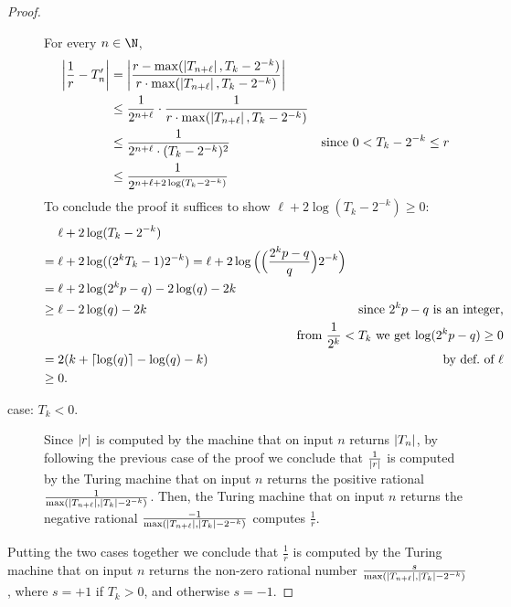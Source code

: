 \begin{proof}
\begin{description}
      For
      every $n \in \N$,
      \begin{align*}
        \left|\frac{1}{r} - T_n'\right|
        &= \left|\frac{r - \max(\left|T_{n+\ell}\right|,T_{k}-2^{-k})}{r \cdot \max(\left|T_{n+\ell}\right|,T_{k}-2^{-k})}\right|\\
        &\leq \frac{1}{2^{n+\ell}} 
        \cdot \frac{1}{r \cdot \max(\left|T_{n+\ell}\right|,T_{k}-2^{-k})}\\
        &\leq \frac{1}{2^{n+\ell} \cdot (T_k-2^{-k})^2}
        &\text{since } 0 < T_k - 2^{-k} \leq r\\
        &\leq \frac{1}{2^{n+\ell+2\log(T_k - 2^{-k})}}
      \end{align*}
      To conclude the proof it suffices to show $\ell + 2\log(T_k-2^{-k}) \geq 0$:
      \begin{align*}
        & \ell + 2\log(T_k-2^{-k})\\
        ={}& \ell + 2\log((2^{k}T_k-1)2^{-k})
        = \ell + 2\log\Big(\Big(\frac{2^{k}p-q}{q}\Big)2^{-k}\Big)\\
        ={}& \ell + 2\log(2^{k}p-q) -2\log(q) -2k\\
        \geq{}& \ell -2\log(q) -2k 
        & \text{since $2^kp-q$ is an integer,}\\
        && \hspace{-1.8cm}\text{from $\frac{1}{2^k} < T_k$ we get $\log(2^{k}p-q) \geq 0$}\\
        ={}& 2(k+\ceil{\log(q)}-\log(q)-k)
        &\text{by def.~of~$\ell$}\\
        \geq{}& 0.
      \end{align*}
    \item[case: $T_k < 0$.] 
      Since $\left|r\right|$ is computed by the machine that on input $n$ returns $\left|T_n\right|$, 
      by following the previous case of the proof
      we conclude that $\frac{1}{\left|r\right|}$ 
      is computed by the Turing machine that on input $n$
      returns the positive rational $\frac{1}{\max(\left|T_{n+\ell}\right|,\left|T_k\right| - 2^{-k})}$.
      Then, the Turing machine that on input $n$
      returns the negative rational $\frac{-1}{\max(\left|T_{n+\ell}\right|,\left|T_k\right| - 2^{-k})}$
      computes $\frac{1}{r}$.
  \end{description}
  Putting the two cases together we conclude that $\frac{1}{r}$ 
  is computed by the Turing machine 
  that on input $n$ returns the non-zero rational number $\frac{s}{\max(\left|T_{n+\ell}\right|,\left|T_k\right| - 2^{-k})}$, 
  where $s = +1$ if $T_k > 0$, and otherwise $s = -1$.
\end{proof}


